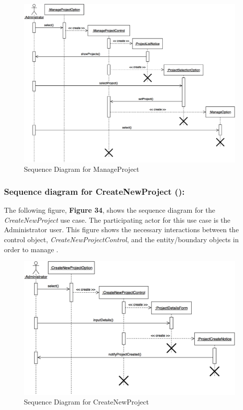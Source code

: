 \documentclass[12pt,letterpaper]{article}
\begin{document}
\begin{figure}[H]
	\centering{}
	\includegraphics[scale=0.3]{imgs/seq/manage-project.png}
	\caption{Sequence Diagram for ManageProject}
\end{figure}

\subsubsection*{Sequence diagram for CreateNewProject (\createnewproject{}):}

The following figure, {\bf Figure 34}, shows the sequence diagram for the {\it CreateNewProject} use case. The participating actor for this use case is
the Administrator user. This figure shows the necessary interactions between the control object, {\it CreateNewProjectControl}, and the
entity/boundary objects in order to manage \createnewproject{}.

\begin{figure}[H]
	\centering{}
	\includegraphics[scale=0.3]{imgs/seq/create-new-project.png}
	\caption{Sequence Diagram for CreateNewProject}
\end{figure}
\end{document}
